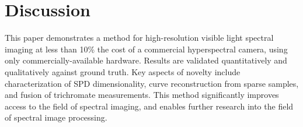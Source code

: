 \documentclass[twocolumn,10pt]{asme2ej}
\newcommand{\id}{\hspace{6 mm}}
\begin{document}
%


\clearpage
\twocolumn

\section{Discussion}

This paper demonstrates a method for high-resolution visible light spectral imaging at less than 10\% the cost of a commercial hyperspectral camera, using only commercially-available hardware. Results are validated quantitatively and qualitatively against ground truth. Key aspects of novelty include characterization of SPD dimensionality, curve reconstruction from sparse samples, and fusion of trichromate measurements. This method significantly improves access to the field of spectral imaging, and enables further research into the field of spectral image processing.

\end{document}
